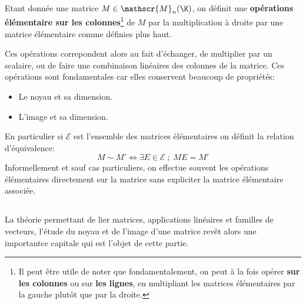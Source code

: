 \subsection*{}
Etant donnée une matrice \( M \in \mathscr{M}_n( \K) \), on définit une \textbf{opérations élémentaire sur les colonnes}\footnote[1]{Il peut être utile de noter que fondamentalement, on peut à la fois opérer \textbf{sur les colonnes} ou sur \textbf{les lignes}, en multipliant les matrices élémentaires par la gauche plutôt que par la droite.} de \( M \) par la multiplication à droite par une matrice élémentaire comme définies plus haut.\<

Ces opérations correpondent alors au fait d'échanger, de multiplier par un scalaire, ou de faire une combinaison linéaires des colonnes de la matrice. Ces opérations sont fondamentales car elles conservent beaucoup de propriétés:
\begin{itemize}
   \item Le noyau et sa dimension.
   \item L'image et sa dimension.
\end{itemize}
En particulier si \( \mathscr{E} \) est l'ensemble des matrices élémentaires on définit la relation d'équivalence:
\[ 
   M \sim M' \iff \exists E \in \mathscr{E} \; ; \; ME = M' 
\]
Informellement et sauf cas particuliers, on effectue souvent les opérations élémentaires directement sur la matrice sans expliciter la matrice élémentaire associée.
\subsection*{}

La théorie permettant de lier matrices, applications linéaires et familles de vecteurs, l'étude du noyau et de l'image d'une matrice revêt alors une importantce capitale qui est l'objet de cette partie.\<

